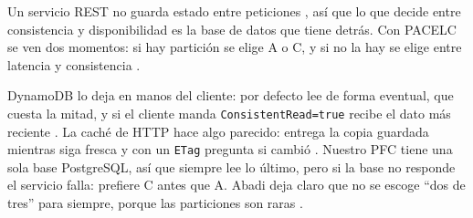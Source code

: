 Un servicio REST no guarda estado entre peticiones \cite{fielding2000}, así que lo que decide entre consistencia y disponibilidad es la base de datos que tiene detrás. Con PACELC se ven dos momentos: si hay partición se elige A o C, y si no la hay se elige entre latencia y consistencia \cite{abadi2012}.

DynamoDB lo deja en manos del cliente: por defecto lee de forma eventual, que cuesta la mitad, y si el cliente manda \texttt{ConsistentRead=true} recibe el dato más reciente \cite{aws_consistencia}. La caché de HTTP hace algo parecido: entrega la copia guardada mientras siga fresca y con un \texttt{ETag} pregunta si cambió \cite{rfc9111}. Nuestro PFC tiene una sola base PostgreSQL, así que siempre lee lo último, pero si la base no responde el servicio falla: prefiere C antes que A. Abadi deja claro que no se escoge \enquote{dos de tres} para siempre, porque las particiones son raras \cite{abadi2012}.
